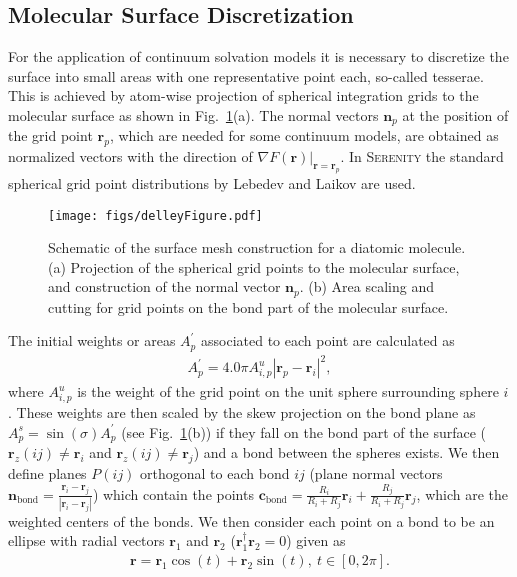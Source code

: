 \subsection{Molecular Surface Discretization}
For the application of continuum solvation models\cite{Tomasi2005} it is necessary to
discretize the surface into small areas with one representative point each, so-called tesserae.
This is achieved by atom-wise projection of spherical integration grids to the molecular
surface as shown in Fig.~\ref{fig:delleySurfaceConstruction}(a). The normal vectors $\pmb{n}_p$
at the position of the grid point $\pmb{r}_p$, which are needed for some continuum models, are obtained as
normalized vectors with the direction of $\left.\nabla F(\pmb{r})\right|_{\pmb{r}=\pmb{r}_p}$.
In \textsc{Serenity} the standard spherical grid point distributions by Lebedev and Laikov are used.
\begin{figure}
	\centering
	\texttt{[image: figs/delleyFigure.pdf]}
	\caption{Schematic of the surface mesh construction for a diatomic molecule.
			 (a) Projection of the spherical grid points to the molecular surface, and
			     construction of the normal vector $\pmb{n}_p$.
			 (b) Area scaling and cutting for grid points on the bond part of the molecular
			     surface.}
	\label{fig:delleySurfaceConstruction}
\end{figure}

The initial weights or areas $A_p^\prime$ associated to each point are calculated as
\begin{align}
	A_p^\prime = 4.0\pi A_{i,p}^{u}|\pmb{r}_p-\pmb{r}_i|^2,
\end{align}
where $A_{i,p}^{u}$ is the weight of the grid point on the unit sphere surrounding sphere $i$.
These weights are then scaled by the skew projection on the bond plane as $A_p^s = \sin(\sigma) A_p^\prime$
(see Fig.~\ref{fig:delleySurfaceConstruction}(b)) if they fall on the bond part of the surface
($\pmb{r}_z(ij) \neq \pmb{r}_i$ and $\pmb{r}_z(ij) \neq \pmb{r}_j$) and a bond between the spheres exists.
We then define planes $P(ij)$ orthogonal to each bond $ij$ (plane normal vectors
$\pmb{n}_\mathrm{bond} = \frac{\pmb{r}_i-\pmb{r}_j}{|\pmb{r}_i-\pmb{r}_j|}$) which contain the points
$\pmb{c}_\mathrm{bond} = \frac{R_i}{R_i+R_j} \pmb{r}_i +\frac{R_j}{R_i+R_j} \pmb{r}_j$, which
are the weighted centers of the bonds. We then consider each point on a bond to be an ellipse with
radial vectors $\pmb{r}_1$ and $\pmb{r}_2$ ($\pmb{r}_1^\dagger\pmb{r}_2 = 0$) given as
\begin{align}
	\pmb{r} = \pmb{r}_1 \cos(t) + \pmb{r}_2 \sin(t),~t\in [0,2\pi].
\end{align}


